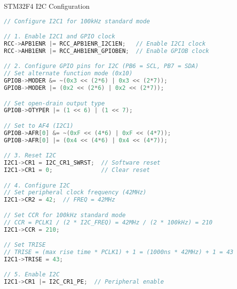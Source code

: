 \begin{code}{STM32F4 I2C Configuration}
\begin{lstlisting}[language=C, style=basesmol]
// Configure I2C1 for 100kHz standard mode

// 1. Enable I2C1 and GPIO clock
RCC->APB1ENR |= RCC_APB1ENR_I2C1EN;   // Enable I2C1 clock
RCC->AHB1ENR |= RCC_AHB1ENR_GPIOBEN;  // Enable GPIOB clock

// 2. Configure GPIO pins for I2C (PB6 = SCL, PB7 = SDA)
// Set alternate function mode (0x10)
GPIOB->MODER &= ~(0x3 << (2*6) | 0x3 << (2*7));
GPIOB->MODER |= (0x2 << (2*6) | 0x2 << (2*7));

// Set open-drain output type
GPIOB->OTYPER |= (1 << 6) | (1 << 7);

// Set to AF4 (I2C1)
GPIOB->AFR[0] &= ~(0xF << (4*6) | 0xF << (4*7));
GPIOB->AFR[0] |= (0x4 << (4*6) | 0x4 << (4*7));

// 3. Reset I2C
I2C1->CR1 = I2C_CR1_SWRST;  // Software reset
I2C1->CR1 = 0;              // Clear reset

// 4. Configure I2C
// Set peripheral clock frequency (42MHz)
I2C1->CR2 = 42;  // FREQ = 42MHz

// Set CCR for 100kHz standard mode
// CCR = PCLK1 / (2 * I2C_FREQ) = 42MHz / (2 * 100kHz) = 210
I2C1->CCR = 210;

// Set TRISE
// TRISE = (max rise time * PCLK1) + 1 = (1000ns * 42MHz) + 1 = 43
I2C1->TRISE = 43;

// 5. Enable I2C
I2C1->CR1 |= I2C_CR1_PE;  // Peripheral enable
\end{lstlisting}
\end{code}


